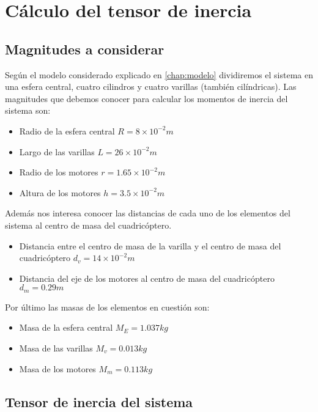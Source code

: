 \documentclass[main]{subfiles}
\begin{document}


\chapter{Cálculo del tensor de inercia}
\label{chap:anexo_tensores}

\section{Magnitudes a considerar}
Según el modelo considerado explicado en \ref{chap:modelo} dividiremos el sistema en una esfera central, cuatro cilindros y cuatro varillas (también cilíndricas). Las magnitudes que debemos conocer para calcular los momentos de inercia del sistema son:

\begin{itemize}
\item Radio de la esfera central $R=8\times10^{-2}m$
\item Largo de las varillas $L=26\times10^{-2}m$
\item Radio de los motores $r=1.65\times10^{-2}m$
\item Altura de los motores $h=3.5\times10^{-2}m$
\end{itemize}

Además nos interesa conocer las distancias de cada uno de los elementos del sistema al centro de masa del cuadricóptero.

\begin{itemize}
\item Distancia entre el centro de masa de la varilla y el centro de masa del cuadricóptero $d_v=14\times10^{-2}m$
\item Distancia del eje de los motores al centro de masa del cuadricóptero $d_m=0.29m$
\end{itemize}

Por último las masas de los elementos en cuestión son:

\begin{itemize}
\item Masa de la esfera central $M_E=1.037kg$
\item Masa de las varillas $M_v=0.013kg$
\item Masa de los motores $M_m=0.113kg$
\end{itemize}



\section{Tensor de inercia del sistema}
\end{document}
